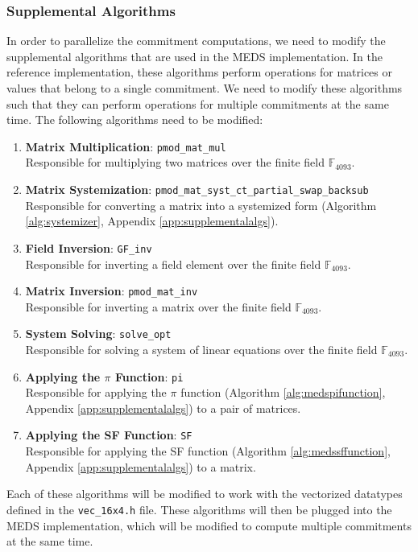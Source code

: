 \documentclass[11pt,a4paper]{report}
\theoremstyle{definition}
\begin{document}
\subsubsection{Supplemental Algorithms}
\label{sec:suppalgorithmsparallelization}
In order to parallelize the commitment computations, we need to modify the supplemental algorithms that are used in the MEDS implementation. In the reference implementation, these algorithms perform operations for matrices or values that belong to a single commitment. We need to modify these algorithms such that they can perform operations for multiple commitments at the same time. The following algorithms need to be modified:
\begin{enumerate}
  \item \textbf{Matrix Multiplication}: \texttt{pmod\_mat\_mul}\\
  Responsible for multiplying two matrices over the finite field $\mathbb{F}_{4093}$.
  \item \textbf{Matrix Systemization}: \texttt{pmod\_mat\_syst\_ct\_partial\_swap\_backsub}\\
  Responsible for converting a matrix into a systemized form (Algorithm \ref{alg:systemizer}, Appendix \ref{app:supplementalalgs}).
  \item \textbf{Field Inversion}: \texttt{GF\_inv}\\
  Responsible for inverting a field element over the finite field $\mathbb{F}_{4093}$.
  \item \textbf{Matrix Inversion}: \texttt{pmod\_mat\_inv}\\
  Responsible for inverting a matrix over the finite field $\mathbb{F}_{4093}$.
  \item \textbf{System Solving}: \texttt{solve\_opt}\\
  Responsible for solving a system of linear equations over the finite field $\mathbb{F}_{4093}$.
  \item \textbf{Applying the $\pi$ Function}: \texttt{pi}\\
  Responsible for applying the $\pi$ function (Algorithm \ref{alg:medspifunction}, Appendix \ref{app:supplementalalgs}) to a pair of matrices.
  \item \textbf{Applying the SF Function}: \texttt{SF}\\
  Responsible for applying the SF function (Algorithm \ref{alg:medssffunction}, Appendix \ref{app:supplementalalgs}) to a matrix.
\end{enumerate}
Each of these algorithms will be modified to work with the vectorized datatypes defined in the \texttt{vec\_16x4.h} file. These algorithms will then be plugged into the MEDS implementation, which will be modified to compute multiple commitments at the same time.
\end{document}
